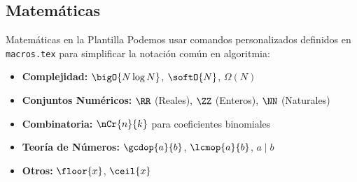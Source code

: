\subsection{Matemáticas}

\begin{frame}{Matemáticas en la Plantilla}
    Podemos usar comandos personalizados definidos en \texttt{macros.tex} 
    para simplificar la notación común en algoritmia:

    \vspace{0.5cm}

    \begin{itemize}
        \item \textbf{Complejidad:} $\bigO{N \log N}$, $\softO{N}$, $\Omega(N)$
        \item \textbf{Conjuntos Numéricos:} $\RR$ (Reales), $\ZZ$ (Enteros), $\NN$ (Naturales)
        \item \textbf{Combinatoria:} $\nCr{n}{k}$ para coeficientes binomiales
        \item \textbf{Teoría de Números:} $\gcdop{a}{b}$, $\lcmop{a}{b}$, $a \mid b$
        \item \textbf{Otros:} $\floor{x}$, $\ceil{x}$
    \end{itemize}
\end{frame}
